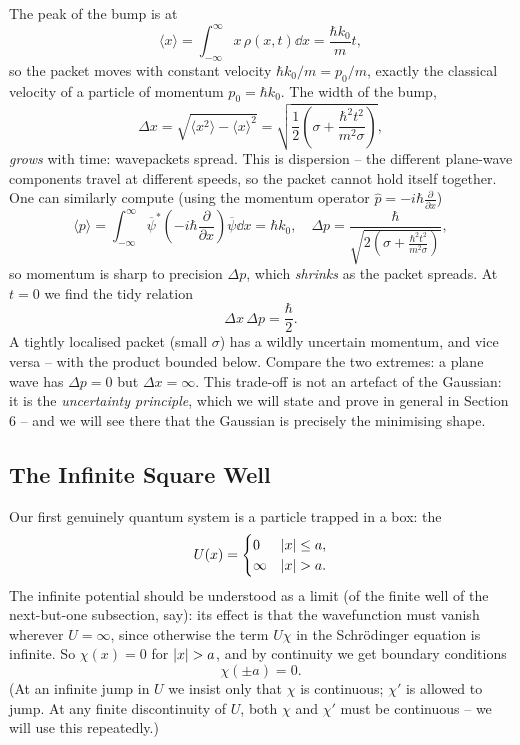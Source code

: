 \documentclass[a4paper]{scrartcl}
\begin{document}
The peak of the bump is at
$$
\langle x \rangle = \int_{-\infty}^{\infty} x \, \rho(x,t) \dd x = \frac{\hbar k_0}{m} t,
$$
so the packet moves with constant velocity $\hbar k_0 / m = p_0 / m$, exactly the classical velocity of a particle of momentum $p_0 = \hbar k_0$. The width of the bump,
$$
\Delta x = \sqrt{\langle x^2 \rangle - \langle x \rangle^2} = \sqrt{\frac{1}{2}\left( \sigma + \frac{\hbar^2 t^2}{m^2 \sigma} \right)},
$$
\emph{grows} with time: wavepackets spread. This is dispersion -- the different plane-wave components travel at different speeds, so the packet cannot hold itself together. One can similarly compute (using the momentum operator $\hat{p} = -i\hbar \frac{\partial}{\partial x}$)
$$
\langle p \rangle = \int_{-\infty}^\infty \overline{\psi}^* \left( -i \hbar \frac{\partial}{\partial x} \right) \overline{\psi} \dd x = \hbar k_0, \quad
\Delta p = \frac{\hbar}{\sqrt{2\left(\sigma + \frac{\hbar^2 t^2}{m^2 \sigma}\right)}},
$$
so momentum is sharp to precision $\Delta p$, which \emph{shrinks} as the packet spreads. At $t = 0$ we find the tidy relation
$$
\Delta x \, \Delta p = \frac{\hbar}{2}.
$$
A tightly localised packet (small $\sigma$) has a wildly uncertain momentum, and vice versa -- with the product bounded below. Compare the two extremes: a plane wave has $\Delta p = 0$ but $\Delta x = \infty$. This trade-off is not an artefact of the Gaussian: it is the \emph{uncertainty principle}, which we will state and prove in general in Section 6 -- and we will see there that the Gaussian is precisely the minimising shape.

\subsection{The Infinite Square Well}

Our first genuinely quantum system is a particle trapped in a box: the 
$$
U(x) = \begin{cases}
    0 & \lvert x\rvert \leq a, \\
    \infty & \lvert x\rvert > a.
\end{cases}
$$
The infinite potential should be understood as a limit (of the finite well of the next-but-one subsection, say): its effect is that the wavefunction must vanish wherever $U = \infty$, since otherwise the term $U \chi$ in the Schr\"odinger equation is infinite. So $\chi(x) = 0$ for $\lvert x\rvert > a$, and by continuity we get boundary conditions
$$
\chi(\pm a) = 0.
$$
(At an infinite jump in $U$ we insist only that $\chi$ is continuous; $\chi'$ is allowed to jump. At any finite discontinuity of $U$, both $\chi$ and $\chi'$ must be continuous -- we will use this repeatedly.)
\end{document}
